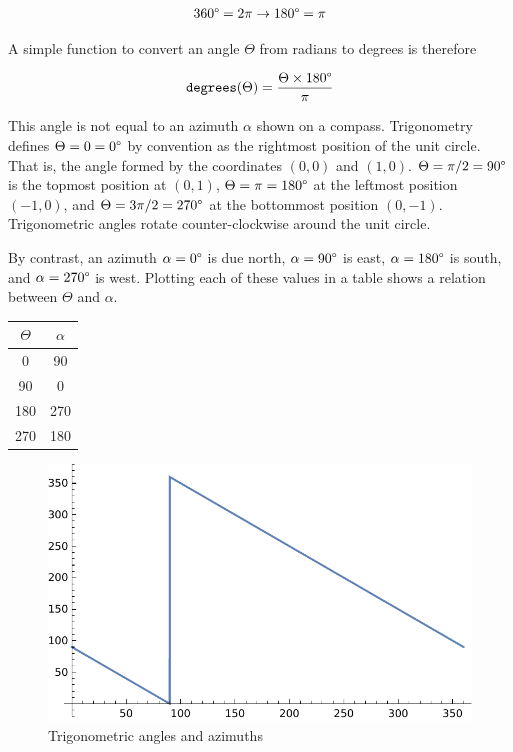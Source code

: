 \documentclass{book}
\begin{document}
\begin{equation}
360\degree = 2\pi \to 180\degree = \pi
\end{equation}

A simple function to convert an angle $\Theta$ from radians to degrees is therefore

\begin{equation}
\texttt{degrees}(\Theta) = \frac{\Theta \times 180\degree}{\pi}
\end{equation}

This angle is not equal to an azimuth $\alpha$ shown on a compass. Trigonometry defines $\Theta=0=0\degree$ by convention as the rightmost position of the unit circle. That is, the angle formed by the coordinates $(0,0)$ and $(1,0)$. $\Theta = \pi/2 = 90\degree$ is the topmost position at $(0,1)$, $\Theta = \pi = 180\degree$ at the leftmost position $(-1,0)$, and $\Theta = {3\pi}/2 = 270\degree$ at the bottommost position $(0,-1)$. Trigonometric angles rotate counter-clockwise around the unit circle.

By contrast, an azimuth $\alpha = 0\degree$ is due north, $\alpha = 90\degree$ is east, $\alpha = 180\degree$ is south, and $\alpha = 270\degree$ is west. Plotting each of these values in a table shows a relation between $\Theta$ and $\alpha$.

\begin{center}
\begin{tabular}{c | c}
$\Theta$ & $\alpha$ \\
\hline
0 & 90 \\
90 & 0 \\
180 & 270 \\
270 & 180 \\
\end{tabular}
\end{center}

\begin{figure}[H]
\centering
\includegraphics[width=\textwidth,keepaspectratio]{figures/azimuth}
\caption{Trigonometric angles and azimuths}
\end{figure}
\end{document}
